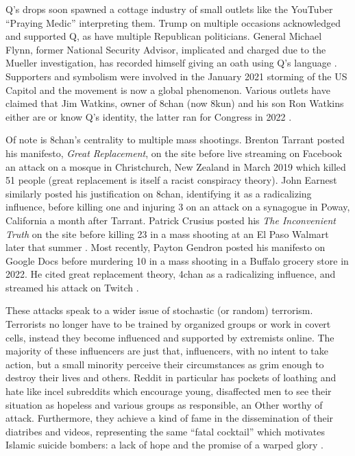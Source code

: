 Q's drops soon spawned a cottage industry of small outlets like the YouTuber ``Praying Medic'' interpreting them.
Trump on multiple occasions acknowledged and supported Q, as have multiple Republican politicians.
General Michael Flynn, former National Security Advisor, implicated and charged due to the Mueller investigation, has recorded himself giving an oath using Q's language \cite{gilbert2021}.
Supporters and symbolism were involved in the January 2021 storming of the US Capitol and the movement is now a global phenomenon.
Various outlets have claimed that Jim Watkins, owner of 8chan (now 8kun) and his son Ron Watkins either are or know Q's identity, the latter ran for Congress in 2022 \cite{schager2021}.

Of note is 8chan's centrality to multiple mass shootings.
Brenton Tarrant posted his manifesto, \emph{Great Replacement}, on the site before live streaming on Facebook an attack on a mosque in Christchurch, New Zealand in March 2019 which killed 51 people (great replacement is itself a racist conspiracy theory).
John Earnest similarly posted his justification on 8chan, identifying it as a radicalizing influence, before killing one and injuring 3 on an attack on a synagogue in Poway, California a month after Tarrant.
Patrick Crusius posted his \emph{The Inconvenient Truth} on the site before killing 23 in a mass shooting at an El Paso Walmart later that summer \cite{baele2023}.
Most recently, Payton Gendron posted his manifesto on Google Docs before murdering 10 in a mass shooting in a Buffalo grocery store in 2022.
He cited great replacement theory, 4chan as a radicalizing influence, and streamed his attack on Twitch \cite{collins2022}.

These attacks speak to a wider issue of stochastic (or random) terrorism.
Terrorists no longer have to be trained by organized groups or work in covert cells, instead they become influenced and supported by extremists online.
The majority of these influencers are just that, influencers, with no intent to take action, but a small minority perceive their circumstances as grim enough to destroy their lives and others.
Reddit in particular has pockets of loathing and hate like incel subreddits which encourage young, disaffected men to see their situation as hopeless and various groups as responsible, an Other worthy of attack.
Furthermore, they achieve a kind of fame in the dissemination of their diatribes and videos, representing the same ``fatal cocktail'' which motivates Islamic suicide bombers: a lack of hope and the promise of a warped glory \cite{victor2003}.

